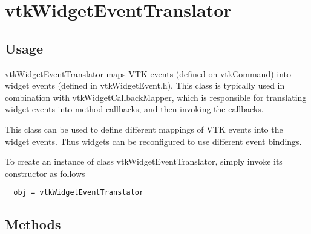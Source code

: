 \section{vtkWidgetEventTranslator}

\subsection{Usage}

 vtkWidgetEventTranslator maps VTK events (defined on vtkCommand) into
 widget events (defined in vtkWidgetEvent.h). This class is typically used
 in combination with vtkWidgetCallbackMapper, which is responsible for
 translating widget events into method callbacks, and then invoking the 
 callbacks.

 This class can be used to define different mappings of VTK events into
 the widget events. Thus widgets can be reconfigured to use different
 event bindings.

To create an instance of class vtkWidgetEventTranslator, simply
invoke its constructor as follows
\begin{verbatim}
  obj = vtkWidgetEventTranslator
\end{verbatim}
\subsection{Methods}

